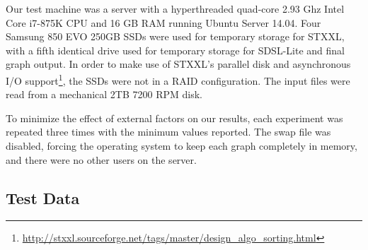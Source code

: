 
Our test machine was a server with a hyperthreaded quad-core 2.93 Ghz Intel Core i7-875K CPU and 16 GB RAM running
Ubuntu Server 14.04. Four Samsung 850 EVO 250GB SSDs were used for temporary storage for STXXL,
with a fifth identical drive used for temporary storage for SDSL-Lite and final graph output. In order to make
use of STXXL's parallel disk and asynchronous I/O support\footnote{\url{http://stxxl.sourceforge.net/tags/master/design_algo_sorting.html}},
the SSDs were not in a RAID configuration. The input files were read from a mechanical 2TB 7200 RPM disk.

To minimize the effect of external factors on our results, each experiment was repeated three times with the minimum values
reported. The swap file was disabled, forcing the operating system to keep each graph completely in memory, and
there were no other users on the server.


\subsection{Test Data}


